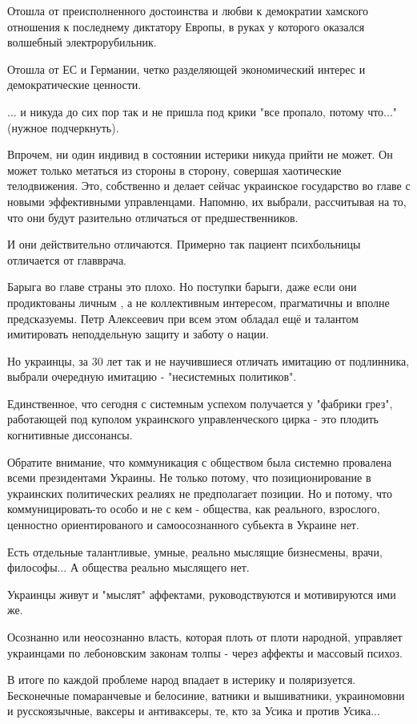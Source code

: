 Отошла от преисполненного достоинства и любви к демократии хамского отношения к
последнему диктатору Европы, в руках у которого оказался волшебный
электрорубильник.

 Отошла от ЕС и Германии, четко разделяющей экономический интерес и
 демократические ценности.

... и никуда до сих пор так и не пришла под крики "все  пропало, потому что..."
(нужное подчеркнуть).

Впрочем, ни один индивид в состоянии истерики никуда прийти не может. Он может
только метаться из стороны в сторону, совершая хаотические телодвижения. Это,
собственно и делает сейчас украинское государство во главе с новыми
эффективными управленцами. Напомню, их выбрали, рассчитывая на то, что они
будут разительно отличаться от предшественников. 

И они действительно отличаются. Примерно так пациент психбольницы отличается от
главврача.

Барыга во главе страны это плохо. Но поступки барыги, даже если они
продиктованы личным , а не коллективным интересом, прагматичны и вполне
предсказуемы. Петр Алексеевич  при всем этом обладал ещё и талантом имитировать
неподдельную защиту и заботу о нации.

Но украинцы, за 30 лет так и не научившиеся отличать имитацию от подлинника,
выбрали очередную имитацию  - "несистемных политиков".

Единственное, что сегодня с системным успехом получается у "фабрики грез",
работающей под куполом украинского управленческого цирка - это плодить
когнитивные диссонансы.

Обратите внимание, что коммуникация с обществом была системно провалена всеми
президентами Украины. Не только потому, что позиционирование в украинских
политических реалиях не предполагает позиции. Но и потому, что
коммуницировать-то особо и не с кем - общества, как реального, взрослого,
ценностно ориентированого и самоосознанного субьекта в Украине нет.

Есть отдельные талантливые, умные, реально мыслящие бизнесмены, врачи,
философы... А общества реально мыслящего нет.

Украинцы живут и "мыслят" аффектами, руководствуются и мотивируются ими же.

Осознанно или неосознанно власть, которая плоть от плоти народной, управляет
украинцами по лебоновским  законам толпы - через аффекты и массовый психоз. 

В итоге по каждой проблеме народ впадает в истерику и поляризуется. Бесконечные
помаранчевые и белосиние, ватники и вышиватники, украиномовни и русскоязычные,
ваксеры и антиваксеры, те, кто за Усика и против Усика...


